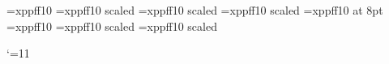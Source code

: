 \immediate{}%

\font\xppffsixteen=xppff10
\font\xppfftwenty=xppff10 scaled 
\font\xppfftwentyfour=xppff10 scaled 
\font\xppfftwentynine=xppff10 scaled 
\font\tinyxppff=xppff10 at 8pt
\font\smallxppff=xppff10
\font\normxppff=xppff10 scaled 
\font\medxppff=xppff10 scaled 

\edef\catcodeat{\the\catcode`\@}\catcode`\@=11

\def\xppff{%
\ifdim\internote<\p@seven6\Internote \tinyxppff
\else\ifdim\internote<.95\Internote \smallxppff
\else\ifdim\internote<1.19\Internote \normxppff
\else\medxppff\fi\fi\fi}

\def\f{{\xppff f}}%
\def\ff{{\xppff ff}}%
\def\fp{{\xppff fp}}%
\def\sF{{\xppff sf}}%
\def\fff{{\xppff fff}}%
\def\ffff{{\xppff ffff}}%
\def\mf{{\xppff mf}}%
\def\p{{\xppff p}}%
\def\pp{{\xppff pp}}%
\def\ppp{{\xppff ppp}}%
\def\pppp{{\xppff pppp}}%
\def\sfz{{\xppff sfz}}%
\def\sfzp{{\xppff sfzp}}%
\def\mp@{{\xppff mp}}%
\let\mezzopiano\mp@


